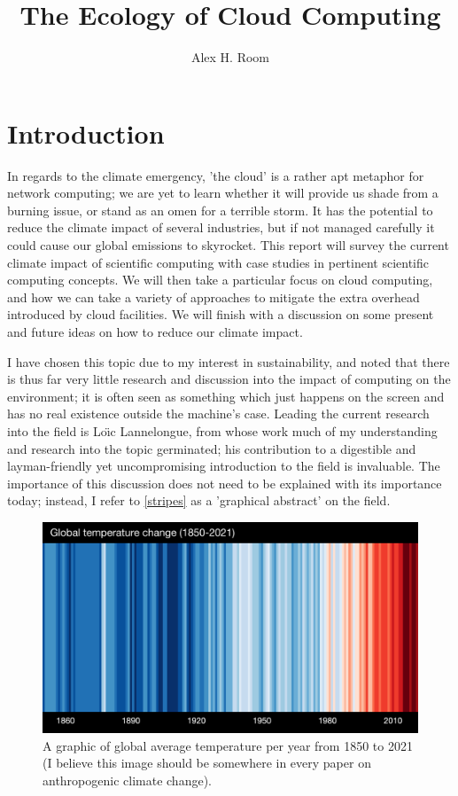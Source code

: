 \documentclass{article}
\title{The Ecology of Cloud Computing}
\author{Alex H. Room}
\begin{document}
\maketitle



\section{Introduction}

In regards to the climate emergency, 'the cloud' is a rather apt metaphor for network computing; we are yet to learn whether it will provide us shade from a burning issue, or stand as an omen for a terrible storm. It has the potential to reduce the climate impact of several industries, but if not managed carefully it could cause our global emissions to skyrocket. This report will survey the current climate impact of scientific computing with case studies in pertinent scientific computing concepts. We will then take a particular focus on cloud computing, and how we can take a variety of approaches to mitigate the extra overhead introduced by cloud facilities. We will finish with a discussion on some present and future ideas on how to reduce our climate impact. \newline

I have chosen this topic due to my interest in sustainability, and noted that there is thus far very little research and discussion into the impact of computing on the environment; it is often seen as something which just happens on the screen and has no real existence outside the machine's case. Leading the current research into the field is Lo{\"\i}c Lannelongue, from whose work much of my understanding and research into the topic germinated; his contribution to a digestible and layman-friendly yet uncompromising introduction to the field is invaluable. The importance of this discussion does not need to be explained with its importance today; instead, I refer to \autoref{stripes} as a 'graphical abstract' on the field.

\begin{figure}[!ht]
\begin{center}
    \includegraphics[width=.6\textwidth]{Diagrams/GLOBE---1850-2021-MO-withlabels.png}
        \caption{A graphic of global average temperature per year from 1850 to 2021 (I believe this image should be somewhere in every paper on anthropogenic climate change). \citep{hawkins2021show}}
	\label{stripes}
\end{center}
\end{figure}
\end{document}
